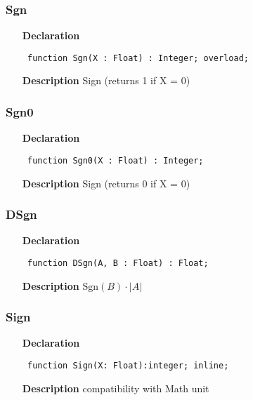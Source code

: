 \documentclass[12pt,a4paper,oneside]{report}
\newcommand{\lmath}[1]{   %
	\marginpar{\vspace{#1} 
		\begin{flushright}
			LMath
	\end{flushright} }
}
\newcommand{\declarationitem}[1]{\textbf{#1}}
\newcommand{\descriptiontitle}[1]{\textbf{#1}}
\newcommand{\code}[1]{\texttt{#1}}
\begin{document}
\subsubsection{Sgn}
\label{uminmax-Sgn}
\begin{itemize}\item[\declarationitem{Declaration}\hfill]
	\begin{flushleft}
		\code{
			function Sgn(X : Float) : Integer; overload;}
	\end{flushleft}
	\item[\descriptiontitle{Description}]
	Sign (returns 1 if X = 0)
\end{itemize}
\subsubsection{Sgn0}
\label{uminmax-Sgn0}
\begin{itemize}\item[\declarationitem{Declaration}\hfill]
	\begin{flushleft}
		\code{
			function Sgn0(X : Float) : Integer;}
	\end{flushleft}
	\item[\descriptiontitle{Description}]
	Sign (returns 0 if X = 0)	
\end{itemize}
\subsubsection{DSgn}
\label{uminmax-DSgn}
\begin{itemize}\item[\declarationitem{Declaration}\hfill]
	\begin{flushleft}
		\code{
			function DSgn(A, B : Float) : Float;}
	\end{flushleft}
	\par
	\item[\descriptiontitle{Description}]
	$\textrm{Sgn}(B)\cdot|A|$
\end{itemize}
\subsubsection{Sign}
\lmath{-24pt}
\label{uminmax-Sign}
\begin{itemize}\item[\declarationitem{Declaration}\hfill]
	\begin{flushleft}
		\code{
			function Sign(X: Float):integer; inline;}
		
	\end{flushleft}
	
	\par
	\item[\descriptiontitle{Description}]
	compatibility with Math unit
	
\end{itemize}
\end{document}
